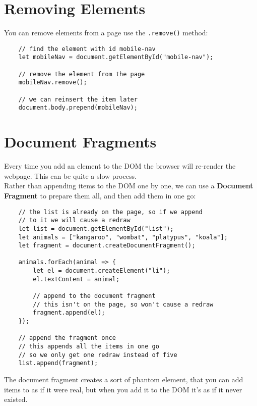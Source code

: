 \section{Removing Elements}

You can remove elements from a page use the \texttt{.remove()} method:

\begin{verbatim}
    // find the element with id mobile-nav
    let mobileNav = document.getElementById("mobile-nav");

    // remove the element from the page
    mobileNav.remove();

    // we can reinsert the item later
    document.body.prepend(mobileNav);
\end{verbatim}

\pagebreak

\section{Document Fragments}

Every time you add an element to the DOM the browser will re-render the webpage. This can be quite a slow process.
\\

Rather than appending items to the DOM one by one, we can use a \textbf{Document Fragment} to prepare them all, and then add them in one go:

\begin{verbatim}
    // the list is already on the page, so if we append
    // to it we will cause a redraw
    let list = document.getElementById("list");
    let animals = ["kangaroo", "wombat", "platypus", "koala"];
    let fragment = document.createDocumentFragment();

    animals.forEach(animal => {
        let el = document.createElement("li");
        el.textContent = animal;

        // append to the document fragment
        // this isn't on the page, so won't cause a redraw
        fragment.append(el);
    });

    // append the fragment once
    // this appends all the items in one go
    // so we only get one redraw instead of five
    list.append(fragment);
\end{verbatim}

The document fragment creates a sort of phantom element, that you can add items to as if it were real, but when you add it to the DOM it's as if it never existed.
\\

